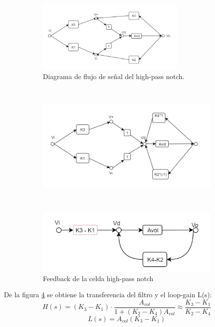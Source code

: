 \documentclass[../../tc_tp5_main.tex]{subfiles}
\begin{document}
\begin{figure}[H]	%
	\centering
	\begin{subfigure}[t]{0.8\textwidth}
		\centering
		\includegraphics[width=0.8\textwidth]{imagenes/SFG1.png}
		\caption{Diagrama de flujo de se\~nal del high-pass notch.}
		\label{fig:ej3_SFG1}
	\end{subfigure}%
	\\
	\begin{subfigure}[t]{0.6\textwidth}
		\centering
		\includegraphics[width=\textwidth]{imagenes/SFG2.png}
		\caption{}
		\label{fig:ej3_SFG2}
	\end{subfigure}%
	\\
	\begin{subfigure}[t]{0.6\textwidth}
		\centering
		\includegraphics[width=\textwidth]{imagenes/SFG3.png}
		\caption{Feedback de la celda high-pass notch}
		\label{fig:ej3_SFG3_feedback}
	\end{subfigure}	
	\caption{}
\end{figure}



De la figura \ref{fig:ej3_SFG3_feedback} se obtiene la transferencia del filtro y el loop-gain L(s):
\begin{equation}
	H(s) = (K_3-K_1)\cdot \frac{A_{vol}}{1+(K_2-K_4)A_{vol}} \approx \frac{K_3-K_1}{K_2-K_4}	
\end{equation}
\begin{equation}
	L(s) = A_{vol}(K_3-K_1)
\end{equation}
\end{document}
